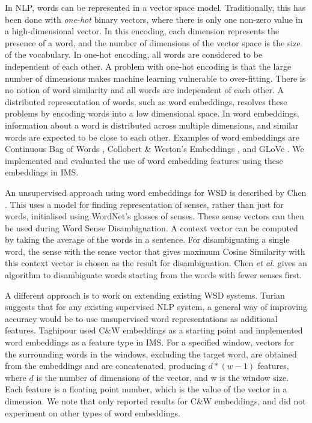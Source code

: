 In NLP, words can be represented in a vector space model. Traditionally, this has been done with {\it one-hot} binary vectors, where there is only one non-zero value in a high-dimensional vector. In this encoding, each dimension represents the presence of a word, and the number of dimensions of the vector space is the size of the vocabulary. In one-hot encoding, all words are considered to be independent of each other. A problem with one-hot encoding is that the large number of dimensions makes machine learning vulnerable to over-fitting. There is no notion of word similarity and all words are independent of each other. A distributed representation of words, such as word embeddings, resolves these problems by encoding words into a low dimensional space. In word embeddings, information about a word is distributed across multiple dimensions, and similar words are expected to be close to each other. Examples of word embeddings are Continuous Bag of Words \cite{mikolovword2vec}, Collobert \& Weston's Embeddings \cite{collobert2008unified}, and GLoVe \cite{pennington2014glove}. We implemented and evaluated the use of word embedding features using these embeddings in IMS. 


An unsupervised approach using word embeddings for WSD is described by Chen . This uses a model for finding representation of senses, rather than just for words, initialised using WordNet's glosses of senses. These sense vectors can then be used during Word Sense Disambiguation. A context vector can be computed by taking the average of the words in a sentence. For disambiguating a single word, the sense with the sense vector that gives maximum Cosine Similarity with this context vector is chosen as the result for disambiguation. Chen {\it et al.} gives an algorithm to disambiguate words starting from the words with fewer senses first. 

A different approach is to work on extending existing WSD systems. Turian  suggests that for any existing supervised NLP system, a general way of improving accuracy would be to use unsupervised word representations as additional features. Taghipour  used C\&W embeddings as a starting point and implemented word embeddings as a feature type in IMS. For a specified window, vectors for the surrounding words in the windows, excluding the target word, are obtained from the embeddings and are concatenated, producing $d * (w-1)$ features, where $d$ is the number of dimensions of the vector, and w is the window size. Each feature is a floating point number, which is the value of the vector in a dimension. We note that \cite{Taghipour15} only reported results for C\&W embeddings, and did not experiment on other types of word embeddings.  

